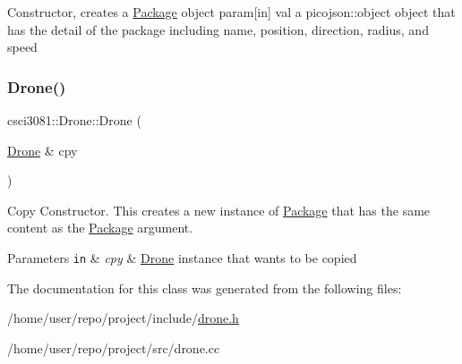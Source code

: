 Constructor, creates a \hyperlink{classcsci3081_1_1Package}{Package} object param\mbox{[}in\mbox{]} val a picojson\+::object object that has the detail of the package including name, position, direction, radius, and speed \mbox{\label{classcsci3081_1_1Drone_a2b97ed6144b5d97790e0950fa62d936f}} 
\subsubsection{\texorpdfstring{Drone()}{Drone()}\hspace{0.1cm}{\footnotesize\ttfamily [2/2]}}
{\footnotesize\ttfamily csci3081\+::\+Drone\+::\+Drone (\begin{DoxyParamCaption}\item[{\hyperlink{classcsci3081_1_1Drone}{Drone} \&}]{cpy }\end{DoxyParamCaption})}



Copy Constructor. This creates a new instance of \hyperlink{classcsci3081_1_1Package}{Package} that has the same content as the \hyperlink{classcsci3081_1_1Package}{Package} argument. 


\begin{DoxyParams}[1]{Parameters}
\mbox{\tt in}  & {\em cpy} & \hyperlink{classcsci3081_1_1Drone}{Drone} instance that wants to be copied \\
\hline
\end{DoxyParams}


The documentation for this class was generated from the following files\+:\begin{DoxyCompactItemize}
\item 
/home/user/repo/project/include/\hyperlink{drone_8h}{drone.\+h}\item 
/home/user/repo/project/src/drone.\+cc\end{DoxyCompactItemize}
